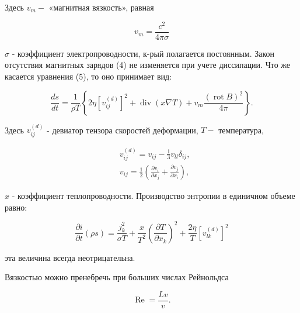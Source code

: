 \documentclass[10pt]{article}
\begin{document}
Здесь $v_{m}-$ «магнитная вязкость», равная



\[

v_{m}=\frac{c^{2}}{4 \pi \sigma}

\]



$\sigma$ - коэффициент электропроводности, к-рый полагается постоянным. Закон отсутствия магнитных зарядов (4) не изменяется при учете диссипации. Что же касается уравнения (5), то оно принимает вид:



\[

\frac{d s}{d t}=\frac{1}{\rho T}\left\{2 \eta\left[v_{i j}^{(d)}\right]^{2}+\operatorname{div}(x \nabla T)+v_{m} \frac{(\operatorname{rot} B)^{2}}{4 \pi}\right\} .

\]



Здесь $v_{i j}^{(d)}$ - девиатор тензора скоростей деформации, $T-$ температура,



\[

\begin{aligned}

& v_{i j}^{(d)}=v_{i j}-\frac{1}{3} v_{l l} \delta_{i j}, \\

& v_{i j}=\frac{1}{2}\left(\frac{\partial v_{i}}{\partial x_{j}}+\frac{\partial v_{j}}{\partial x_{i}}\right),

\end{aligned}

\]



$x$ - коэффициент теплопроводности. Производство энтропии в единичном объеме равно:



\[

\frac{\partial i}{\partial t}(\rho s)=\frac{j_{k}^{2}}{\sigma T}+\frac{x}{T^{2}}\left(\frac{\partial T}{\partial x_{k}}\right)^{2}+\frac{2 \eta}{T}\left[v_{l k}^{(d)}\right]^{2}

\]



эта величина всегда неотрицательна.



Вязкостью можно пренебречь при больших числах Рейнольдса



\[

\operatorname{Re}=\frac{L v}{v} .

\]
\end{document}
